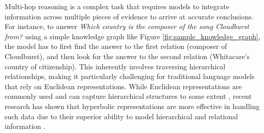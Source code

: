 \documentclass[11pt]{article}
\begin{document}
Multi-hop reasoning is a complex task that requires models to integrate information across multiple pieces of evidence to arrive at accurate conclusions. For instance, to answer \textit{Which country is the composer of the song Cloudburst from?} using a simple knowledge graph like Figure \ref{fig:sample_knowledge_graph}, the model has to first find the answer to the first relation (composer of Cloudburst), and then look for the answer to the second relation (Whitacare's country of citizenship). This inherently involves traversing hierarchical relationships, making it particularly challenging for traditional language models that rely on Euclidean representations. While Euclidean representations are commonly used and can capture hierarchical structures to some extent \cite{nguyen2023cyle, misra2023triggeringmultihopreasoningquestion, zhang2024end}, recent research has shown that hyperbolic representations are more effective in handling such data due to their superior ability to model hierarchical and relational information \cite{nickel2017poincare, dhingra2018embedding, balažević2019multirelationalpoincaregraphembeddings, chami2020lowdimensionalhyperbolicknowledgegraph, xu2022hyperminer}.
\end{document}
